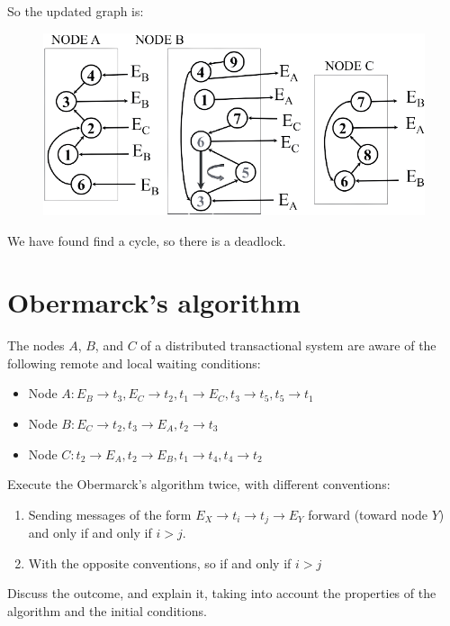 \documentclass[12pt, a4paper]{report}
\newtheorem[style=M,bodystyle=\normalfont]{theorem}{Theorem}
\newtheorem[style=M,bodystyle=\normalfont]{corollary}{Corollary}
\newtheorem[style=M,bodystyle=\normalfont]{lemma}{Lemma}
\newtheorem[style=M,bodystyle=\normalfont]{definition}{Definition}
\begin{document}
        So the updated graph is: 
        \begin{figure}[H]
            \centering
            \includegraphics[width=0.75\linewidth]{images/Ob3.png}
        \end{figure}
        We have found find a cycle, so there is a deadlock. 

    \newpage

    \section{Obermarck's algorithm}
        The nodes $A$, $B$, and $C$ of a distributed transactional system are aware of the following remote and local waiting conditions:
        \begin{itemize}
            \item Node $A: E_B \rightarrow t_3, E_C \rightarrow t_2, t_1 \rightarrow E_C, t_3 \rightarrow t_5, t_5 \rightarrow t_1$
            \item Node $B: E_C \rightarrow t_2, t_3 \rightarrow E_A, t_2 \rightarrow t_3$
            \item Node $C: t_2 \rightarrow E_A, t_2 \rightarrow E_B, t_1 \rightarrow t_4, t_4 \rightarrow t_2$
        \end{itemize}
        Execute the Obermarck's algorithm twice, with different conventions:
        \begin{enumerate}
            \item Sending messages of the form $E_X \rightarrow t_i \rightarrow t_j \rightarrow E_Y$ forward (toward node $Y$) and only 
                if and only if $i > j$. 
            \item With the opposite conventions, so if and only if $i > j$
        \end{enumerate}
        Discuss the outcome, and explain it, taking into account the properties of the algorithm and the initial conditions.
\end{document}
